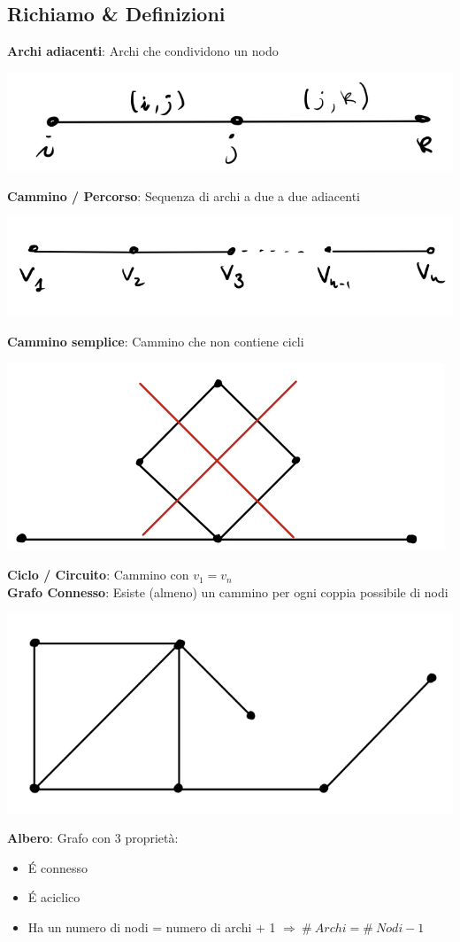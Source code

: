 \documentclass[12pt,a4paper]{article}
\begin{document}
\subsection{Richiamo \& Definizioni}
\textbf{Archi adiacenti}: Archi che condividono un nodo
\begin{center}
\includegraphics[width=0.4\columnwidth]{img/arch_adiac.jpg}\\
\end{center}
\textbf{Cammino / Percorso}: Sequenza di archi a due a due adiacenti
\begin{center}
\includegraphics[width=0.4\columnwidth]{img/cammino.jpg}\\
\end{center}
\textbf{Cammino semplice}: Cammino che non contiene cicli
\begin{center}
\includegraphics[width=0.4\columnwidth]{img/camm_sempl.jpg}\\
\end{center}
\textbf{Ciclo / Circuito}: Cammino con $v_1=v_n$\\
\textbf{Grafo Connesso}: Esiste (almeno) un cammino per ogni coppia possibile di nodi
\begin{center}
\includegraphics[width=0.4\columnwidth]{img/grafo_conn.jpg}\\
\end{center}
\textbf{Albero}: Grafo con 3 proprietà:
\begin{itemize}
\item \'E connesso
\item \'E aciclico
\item Ha un numero di nodi = numero di archi + 1 $\Rightarrow \ \# \ Archi = \# \ Nodi - 1$
\end{itemize}
\end{document}
